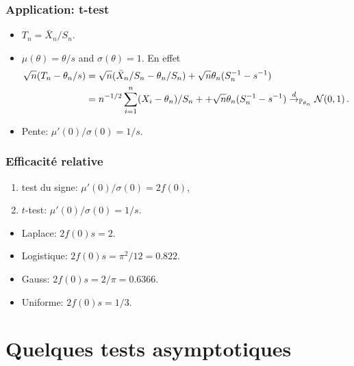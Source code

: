 \begin{frame}
\frametitle{Application: t-test}
\begin{itemize}
\item $T_n = \bar{X}_n/S_n$.
\item $\mu(\theta)= \theta/s$ and $\sigma(\theta)= 1$. En effet
\begin{align*}
\sqrt{n} ( T_n - \theta_n/s)
&= \sqrt{n} ( \bar{X}_n / S_n - \theta_n / S_n) + \sqrt{n} \theta_n (S_n^{-1} - s^{-1}) \\
&= n^{-1/2} \sum_{i=1}^n (X_i - \theta_n)/S_n + + \sqrt{n} \theta_n (S_n^{-1} - s^{-1}) \stackrel{d}{\rightarrow}_{\operatorname{{\mathbb P}}_{\theta_n}} \mathcal{N}(0,1) \,.
\end{align*}
\item \alert{Pente:} $\mu'(0)/\sigma(0)= 1/s$.
\end{itemize}
\end{frame}

\begin{frame}
\frametitle{Efficacité relative}
\begin{enumerate}
\item test du signe: $\mu'(0)/\sigma(0)=2 f(0)$,
\item $t$-test: $\mu'(0)/\sigma(0)=1/s$.
\end{enumerate}

\begin{itemize}
\item Laplace: $2 f(0) s = 2$.
\item Logistique: $2 f(0) s = \pi^2/12=0.822$.
\item Gauss: $2 f(0) s = 2/\pi=0.6366$.
\item Uniforme: $2 f(0) s = 1/3$.
\end{itemize}
\end{frame}

\section{Quelques tests asymptotiques}

